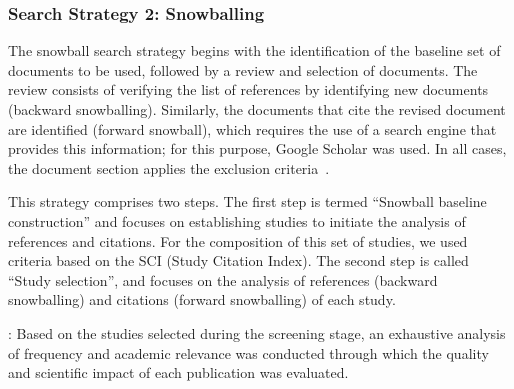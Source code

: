 \subsubsection{Search Strategy 2: Snowballing}

\newcommand{\csiSelected}{24} %
\newcommand{\newSnowballStudies}{3} %
\newcommand{\firstBackwardSnowballStudies}{3} %
\newcommand{\firstForwardSnowballStudies}{4} %
\newcommand{\secondBackwardSnowballStudies}{3} %
\newcommand{\secondForwardSnowballStudies}{5} %

\newcommand{\firstSnowballIterationStudies}{\fpeval{\firstBackwardSnowballStudies+\firstForwardSnowballStudies}}
\newcommand{\secondSnowballIterationStudies}{\fpeval{\secondBackwardSnowballStudies+\secondForwardSnowballStudies}}

\newcommand{\snowballNewStudies}{\fpeval{\firstSnowballIterationStudies+\secondSnowballIterationStudies}}




The snowball search strategy begins with the identification of the baseline set of documents to be used, followed by a review and selection of documents. The review consists of verifying the list of references by identifying new documents (backward snowballing). Similarly, the documents that cite the revised document are identified (forward snowball), which requires the use of a search engine that provides this information; for this purpose, Google Scholar was used. In all cases, the document section applies the exclusion criteria~\cite{Wohlin-01}.

This strategy comprises two steps. The first step is termed ``Snowball baseline construction'' and focuses on establishing studies to initiate the analysis of references and citations. For the composition of this set of studies, we used criteria based on the SCI (Study Citation Index). The second step is called ``Study selection'', and focuses on the analysis of references (backward snowballing) and citations (forward snowballing) of each study.


: Based on the \screenTot{} studies selected during the screening stage, an exhaustive analysis of frequency and academic relevance was conducted through which the quality and scientific impact of each publication was evaluated.

